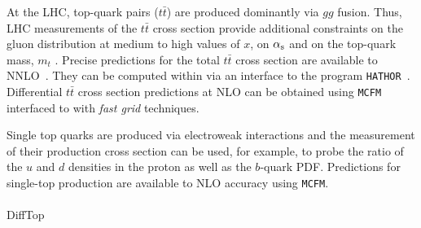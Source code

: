 At the LHC, top-quark pairs ($t \bar t$) are produced dominantly via $gg$ fusion.
Thus, LHC measurements of the $t \bar t$ cross section provide additional 
constraints on the gluon distribution at medium to high values of $x$, 
on $\alpha_\mathrm{s}$ and on the top-quark mass, $m_t$ \cite{cms:top}. 
Precise predictions for the total $t \bar t$ cross section are available 
to NNLO~\cite{Czakon:2013goa}. They can be computed within \fitter via an interface 
to the program \texttt{HATHOR}~\cite{Aliev:2010zk}. Differential $t \bar t$ cross section
predictions at NLO can be obtained using
\texttt{MCFM}~\cite{Campbell:2010ff,Campbell:2009ss,Campbell:2005bb,Campbell:2004ch,Campbell:2012uf} 
interfaced to \fitter with \emph{fast grid} techniques.

Single top quarks are produced via electroweak interactions and the measurement of their production cross section can be used, for example, to probe the ratio of the $u$ and $d$ densities in the proton 
as well as the $b$-quark PDF. Predictions 
for single-top production are available to NLO accuracy using \texttt{MCFM}.
\\
\\
DiffTop


%

